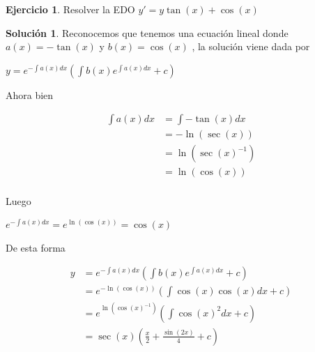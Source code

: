 \documentclass{article}
\theoremstyle{plain}
\theoremstyle{definition}
\newtheorem{ejer}[thm]{Ejercicio}
\newtheorem{sol}[thm]{Solución}
\begin{document}
\newpage



\begin{ejer}Resolver la EDO $\displaystyle y' = y\tan(x)+\cos(x)$ \\
\end{ejer}


\begin{sol}Reconocemos que tenemos una ecuación lineal donde $a(x)=-\tan(x)$ y $b(x)= \cos(x)$ , la solución viene dada por
\end{sol}



\begin{center}
$\displaystyle y = e^{ -\int a(x)dx}\left(  \int b(x) e^{ \int a(x)dx} +c  \right) $
\end{center}

Ahora bien

\begin{align*}
\displaystyle \int a(x)dx &= \int -\tan(x)dx \\
&= -\ln(\sec(x))\\
&= \ln(\sec(x)^{-1})\\
&= \ln(\cos(x))\\
\end{align*}

Luego

\begin{center}
$\displaystyle e^{ -\int a(x)dx}  = e^{\ln(\cos(x))}=\cos(x)$
\end{center}


De esta forma


\begin{align*}
\displaystyle y &= e^{ -\int a(x)dx}\left(  \int b(x) e^{ \int a(x)dx} +c  \right) \\
&= e^{ -\ln(\cos(x))}\left(  \int \cos(x)\cos(x)dx +c  \right)\\
&= e^{ \ln(\cos(x)^{-1})}\left(  \int \cos(x)^2dx +c  \right)\\
&= \sec(x)\left(  \frac{x}{2} + \frac{\sin(2x)}{4}+c  \right)\\
\end{align*}
\end{document}
